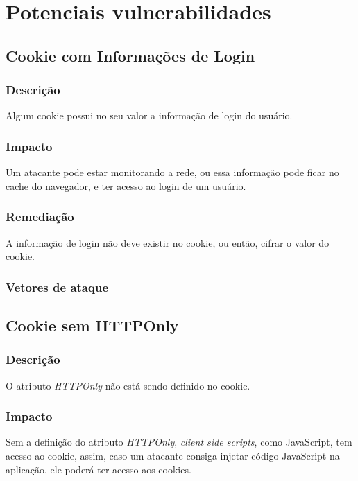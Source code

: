 \documentclass{ufscThesis}
\newcommand{\+}{\discretionary{\mbox{${\bm\cdot}\mkern-1mu$}}{}{}}
\renewcommand\+{\discretionary{}{}{}}
\begin{document}
\chapter{Potenciais vulnerabilidades}

\section{Cookie com Informações de Login}

\subsection{Descrição}

Algum cookie possui no seu valor a informação de login do usuário.

\subsection{Impacto}

Um atacante pode estar monitorando a rede, ou essa informação pode ficar no cache do navegador, e ter acesso ao login de um usuário.

\subsection{Remediação}

A informação de login não deve existir no cookie, ou então, cifrar o valor do cookie.

\subsection{Vetores de ataque}

\section{Cookie sem HTTPOnly}

\subsection{Descrição}

O atributo \emph{HTTPOnly} não está sendo definido no cookie.

\subsection{Impacto}

Sem a definição do atributo \emph{HTTPOnly}, \emph{client side scripts}, como JavaScript, tem acesso ao cookie, assim, caso um atacante consiga injetar código JavaScript na aplicação, ele poderá ter acesso aos cookies.
\end{document}
